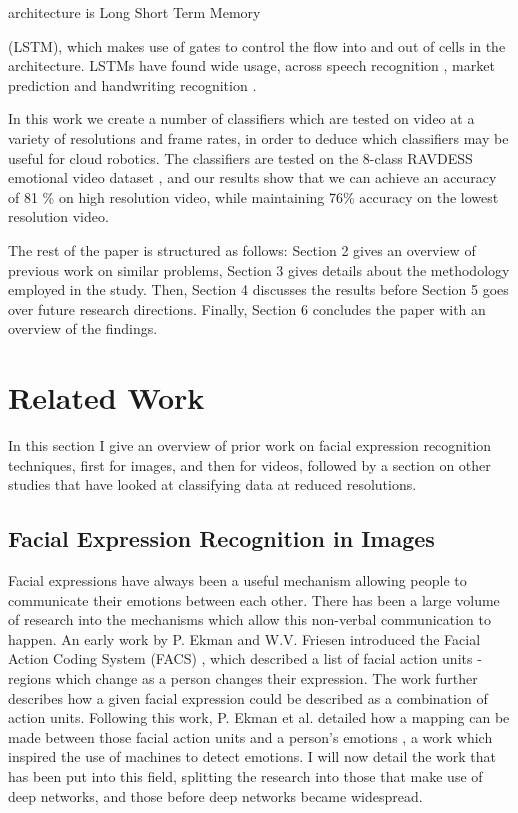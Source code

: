 \documentclass[sigconf]{acmart}
\begin{document}
architecture is Long Short Term Memory \cite{hochreiter1997long} {(LSTM),
which makes use of gates to
control the flow into and out of cells in the architecture. LSTMs have found
wide usage, across speech recognition \cite{graves2005framewise}, market prediction
\cite{islam2020foreign} and handwriting recognition \cite{graves2008unconstrained}.

In this work we create a number of classifiers which are tested on video at a
variety of resolutions and frame rates, in order to deduce which classifiers
may be useful for cloud robotics. The classifiers are tested on the 8-class
RAVDESS emotional
video dataset \cite{livingstone2018ryerson}, and our results show that we can
achieve an accuracy of 81 \% on high resolution video, while maintaining 76\%
accuracy on the lowest resolution video.

The rest of the paper is structured as follows: Section 2 gives an overview of
previous work on similar problems, Section 3 gives details about the
methodology employed in the study. Then, Section 4 discusses the results
before Section 5 goes over future research directions. Finally, Section 6
concludes the paper with an overview of the findings. 

\section{Related Work}

In this section I give an overview of prior work on facial expression recognition
techniques, first for images, and then for videos, followed by a section 
on other studies that have looked at classifying data at reduced resolutions. 

\subsection{Facial Expression Recognition in Images}

Facial expressions have always been a useful mechanism allowing people to 
communicate their emotions between
each other. There has been a large volume of research into the
mechanisms which allow this non-verbal communication to happen. An early work
by P. Ekman and W.V. Friesen introduced the Facial Action Coding System
(FACS) \cite{friesen1978facial}, which described a list of facial action units
- regions which change as a person changes their expression. The work further describes
how a given facial expression could be described as a combination of action
units. Following this work, P. Ekman et al. detailed how a mapping can be made
between those facial action units and a person's emotions
\cite{ekman1997face}, a work which inspired the use of machines to detect
emotions. 
I will now detail the work that has been put into this field, 
splitting the research into those that make use of deep
networks, and those before deep networks became widespread. 

}
\end{document}
